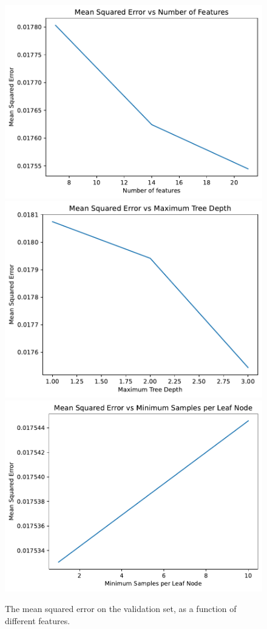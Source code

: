 \documentclass[hidelinks,12pt]{article}
\begin{document}
\subsubsection{}
\begin{figure}[htbp]
    \centering
    \caption{The mean squared error on the validation set, as a function of different features.}
    \includegraphics[width=.75\textwidth]{out/6_3_1.pdf}
    \includegraphics[width=.75\textwidth]{out/6_3_2.pdf}
    \includegraphics[width=.75\textwidth]{out/6_3_3.pdf}
\end{figure}
\end{document}
